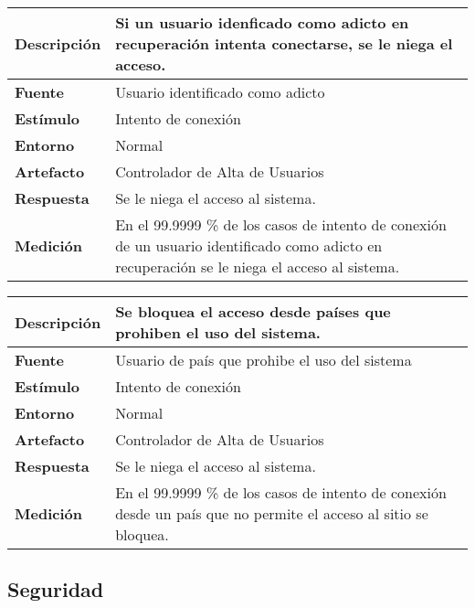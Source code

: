 \begin{center}
  \begin{tabular}{| l | p{10cm} | }
    \hline
	\textbf{Descripción} & Si un usuario idenficado como adicto en recuperación intenta conectarse, se le niega el acceso. \\  \hline
	\textbf{Fuente} & Usuario identificado como adicto\\  \hline
	\textbf{Estímulo} & Intento de conexión\\  \hline
	\textbf{Entorno} & Normal\\  \hline
	\textbf{Artefacto} & Controlador de Alta de Usuarios\\  \hline
	\textbf{Respuesta} & Se le niega el acceso al sistema.\\  \hline
	\textbf{Medición} & En el 99.9999 \% de los casos de intento de conexión de un usuario identificado como adicto en recuperación se le niega el acceso al sistema.\\  \hline
  \end{tabular}
\end{center}  

\begin{center}
  \begin{tabular}{| l | p{10cm} | }
    \hline
	\textbf{Descripción} & Se bloquea el acceso desde países que prohiben el uso del sistema.\\  \hline
	\textbf{Fuente} & Usuario de país que prohibe el uso del sistema\\  \hline
	\textbf{Estímulo} & Intento de conexión\\  \hline
	\textbf{Entorno} & Normal\\  \hline
	\textbf{Artefacto} & Controlador de Alta de Usuarios\\  \hline
	\textbf{Respuesta} & Se le niega el acceso al sistema.\\  \hline
	\textbf{Medición} & En el 99.9999 \% de los casos de intento de conexión desde un país que no permite el acceso al sitio se bloquea.\\  \hline
  \end{tabular}
\end{center} 


\subsection{Seguridad}

